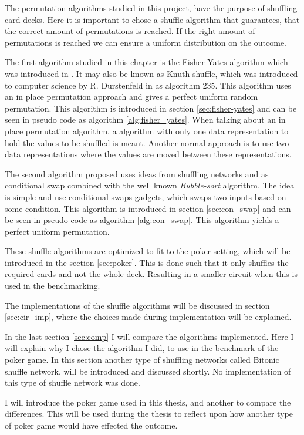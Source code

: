 \documentclass[twoside,11pt,openright]{report}
\begin{document}
The permutation algorithms studied in this project, have the purpose of shuffling card decks. Here it is important to chose a shuffle algorithm that guarantees, that the correct amount of permutations is reached. If the right amount of permutations is reached we can ensure a uniform distribution on the outcome.

The first algorithm studied in this chapter is the Fisher-Yates algorithm which was introduced in \cite{fisher_yates}. It may also be known as Knuth shuffle, which was introduced to computer science by R. Durstenfeld in \cite{durstenfeld} as algorithm 235. This algorithm uses an in place permutation approach and gives a perfect uniform random permutation. This algorithm is introduced in section \ref{sec:fisher-yates} and can be seen in pseudo code as algorithm \ref{alg:fisher_yates}. When talking about an in place permutation algorithm, a algorithm with only one data representation to hold the values to be shuffled is meant. Another normal approach is to use two data representations where the values are moved between these representations.

The second algorithm proposed uses ideas from shuffling networks and \cite{psi} as conditional swap combined with the well known \textit{Bubble-sort} algorithm. The idea is simple and use conditional swaps gadgets, which swaps two inputs based on some condition. This algorithm is introduced in section \ref{sec:con_swap} and can be seen in pseudo code as algorithm \ref{alg:con_swap}. This algorithm yields a perfect uniform permutation.

These shuffle algorithms are optimized to fit to the poker setting, which will be introduced in the section \ref{sec:poker}. This is done such that it only shuffles the required cards and not the whole deck. Resulting in a smaller circuit when this is used in the benchmarking.

The implementations of the shuffle algorithms will be discussed in section \ref{sec:cir_imp}, where the choices made during implementation will be explained.

In the last section \ref{sec:comp} I will compare the algorithms implemented. Here I will explain why I chose the algorithm I did, to use in the benchmark of the poker game. In this section another type of shuffling networks called Bitonic shuffle network, will be introduced and discussed shortly. No implementation of this type of shuffle network was done.

\bigskip

I will introduce the poker game used in this thesis, and another to compare the differences. This will be used during the thesis to reflect upon how another type of poker game would have effected the outcome.
\end{document}
